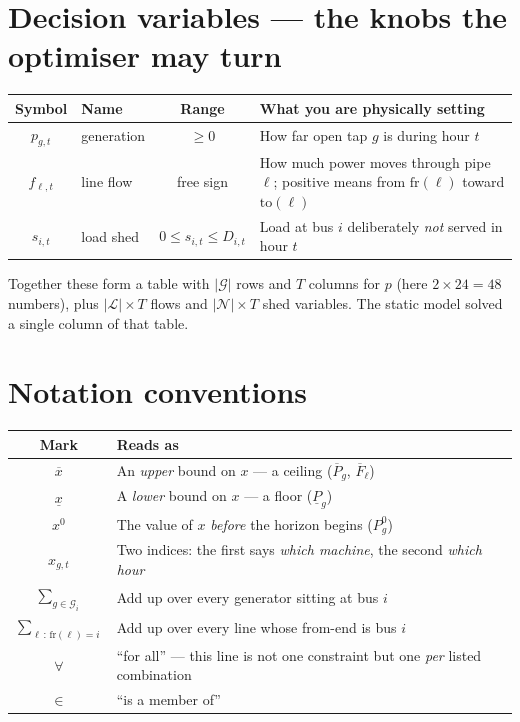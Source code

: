 \documentclass[11pt]{article}
\begin{document}
\section{Decision variables --- the knobs the optimiser may turn}

\begin{center}
\begin{tabular}{@{}c L{3.2cm} c L{8.2cm}@{}}
\toprule
\textbf{Symbol} & \textbf{Name} & \textbf{Range} & \textbf{What you are physically setting} \\
\midrule
$p_{g,t}$ & generation & $\ge 0$ & How far open tap $g$ is during hour $t$ \\
$f_{\ell,t}$ & line flow & free sign & How much power moves through pipe $\ell$; positive means from $\mathrm{fr}(\ell)$ toward $\mathrm{to}(\ell)$ \\
$s_{i,t}$ & load shed & $0 \le s_{i,t} \le D_{i,t}$ & Load at bus $i$ deliberately \emph{not} served in hour $t$ \\
\bottomrule
\end{tabular}
\end{center}

\noindent
Together these form a table with $|\mathcal{G}|$ rows and $T$ columns for $p$ (here $2\times 24
= 48$ numbers), plus $|\mathcal{L}|\times T$ flows and $|\mathcal{N}|\times T$ shed variables.
The static model solved a single column of that table.

\section{Notation conventions}

\begin{center}
\begin{tabular}{@{}c L{12.6cm}@{}}
\toprule
\textbf{Mark} & \textbf{Reads as} \\
\midrule
$\overline{x}$ & An \emph{upper} bound on $x$ --- a ceiling ($\overline{P}_g$, $\overline{F}_\ell$) \\
$\underline{x}$ & A \emph{lower} bound on $x$ --- a floor ($\underline{P}_g$) \\
$x^{0}$ & The value of $x$ \emph{before} the horizon begins ($P^{0}_{g}$) \\
$x_{g,t}$ & Two indices: the first says \emph{which machine}, the second \emph{which hour} \\
$\sum_{g\in\mathcal{G}_i}$ & Add up over every generator sitting at bus $i$ \\
$\sum_{\ell\,:\,\mathrm{fr}(\ell)=i}$ & Add up over every line whose from-end is bus $i$ \\
$\forall$ & ``for all'' --- this line is not one constraint but one \emph{per} listed combination \\
$\in$ & ``is a member of'' \\
\bottomrule
\end{tabular}
\end{center}
\end{document}
